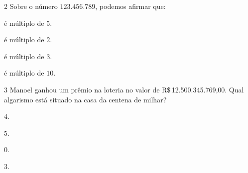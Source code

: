 




\num{2} Sobre o número $123.456.789$, podemos afirmar que:

\begin{escolha}[itemsep=0pt]
\item é múltiplo de $5$.
\item é múltiplo de $2$.
\item é múltiplo de $3$.
\item é múltiplo de $10$.
\end{escolha}








\num{3} Manoel ganhou um prêmio na loteria no valor de R\$\,12.500.345.769,00.
Qual algarismo está situado na casa da centena de milhar?

\begin{escolha}[itemsep=0pt]
\item $4$.
\item $5$.
\item $0$.
\item $3$.
\end{escolha}



